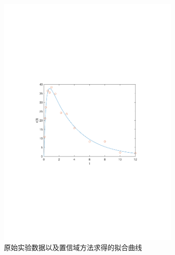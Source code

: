 \documentclass[12pt,a4paper]{article}
\begin{document}
\begin{figure}[t]
    \centering
    \includegraphics[width=0.8\textwidth,trim={3.09cm 9.295cm 3.09cm 9.295cm},clip]{fig/ex8_fit.pdf}
    \caption{原始实验数据以及置信域方法求得的拟合曲线}
    \label{fig:ex8_fit}
\end{figure}
\end{document}
